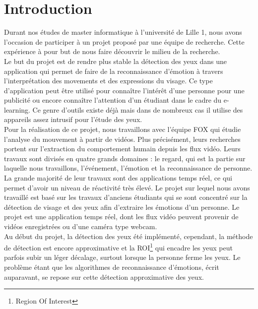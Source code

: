 \section*{Introduction}

Durant nos études de master informatique à l'université de Lille 1,
nous avons l'occasion de participer à un projet proposé par une équipe de
recherche. Cette expérience à pour but de nous faire découvrir le
milieu de la recherche.\\

Le but du projet est de rendre plus stable la détection des yeux dans une
application qui permet de faire de la reconnaissance d'émotion à
travers l'interprétation des movements et des expressions du visage. Ce type
d'application peut être utilisé pour connaître l'intérêt d'une
personne pour une publicité ou encore connaître l'attention d'un étudiant 
dans le cadre du e-learning. Ce genre d'outils existe déjà mais dans de nombreux cas il
utilise des appareils assez intrusif pour l'étude des yeux.\\

Pour la réalisation de ce projet, nous travaillons avec l'équipe FOX qui étudie
l'analyse du mouvement à partir de vidéos. Plus précisément, leurs recherches portent
sur l'extraction du comportement humain depuis les flux vidéo.  Leurs travaux sont
divisés en quatre grands domaines : le regard, qui est la partie sur
laquelle nous travaillons, l'événement, l'émotion et la
reconnaissance de personne. La grande majorité de leur travaux sont
des applications temps réel, ce qui permet d'avoir un niveau de
réactivité très élevé. Le projet sur lequel nous avons travaillé est
basé sur les travaux d'anciens étudiants qui se sont concentré sur la
détection de visage et des yeux afin d'extraire les émotions d'un personne. 
Le projet est une application temps réel, dont les flux vidéo peuvent 
provenir de vidéos enregistrées ou d'une caméra type webcam.\\

Au début du projet, la détection des yeux été implémenté, cependant,
la méthode de détection est encore approximative et la ROI\footnote{Region Of Interest} qui
encadre les yeux peut parfois subir un léger décalage, surtout lorsque 
la personne ferme les yeux. Le problème étant que les algorithmes de reconnaissance 
d'émotions, écrit auparavant, se repose sur cette détection approximative des yeux.\\

